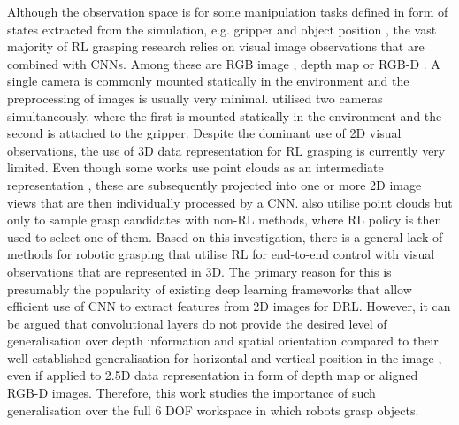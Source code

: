 Although the observation space is for some manipulation tasks defined in form of states extracted from the simulation, e.g. gripper and object position \cite{popov_data-efficient_2017, haarnoja_composable_2018}, the vast majority of RL grasping research relies on visual image observations that are combined with CNNs. Among these are RGB image \cite{tobin_domain_2017, kalashnikov_qt-opt_2018, quillen_deep_2018, kim_acceleration_2020, iqbal_toward_2020}, depth map \cite{gualtieri_learning_2018, breyer_comparing_2019, wu_generative_2020} or RGB-D \cite{zeng_learning_2018, liu_active_2019, daniel_deep_2020}. A single camera is commonly mounted statically in the environment and the preprocessing of images is usually very minimal. \citet{zhan_framework_2020, joshi_robotic_2020} utilised two cameras simultaneously, where the first is mounted statically in the environment and the second is attached to the gripper. Despite the dominant use of 2D visual observations, the use of 3D data representation for RL grasping is currently very limited. Even though some works use point clouds as an intermediate representation \cite{zeng_learning_2018, gualtieri_learning_2018}, these are subsequently projected into one or more 2D image views that are then individually processed by a CNN. \citet{osa_experiments_2017, gualtieri_pick_2018} also utilise point clouds but only to sample grasp candidates with non-RL methods, where RL policy is then used to select one of them. Based on this investigation, there is a general lack of methods for robotic grasping that utilise RL for end-to-end control with visual observations that are represented in 3D. The primary reason for this is presumably the popularity of existing deep learning frameworks that allow efficient use of CNN to extract features from 2D images for DRL. However, it can be argued that convolutional layers do not provide the desired level of generalisation over depth information and spatial orientation compared to their well-established generalisation for horizontal and vertical position in the image \cite{gualtieri_pick_2018}, even if applied to 2.5D data representation in form of depth map or aligned RGB-D images. Therefore, this work studies the importance of such generalisation over the full 6 DOF workspace in which robots grasp objects.

